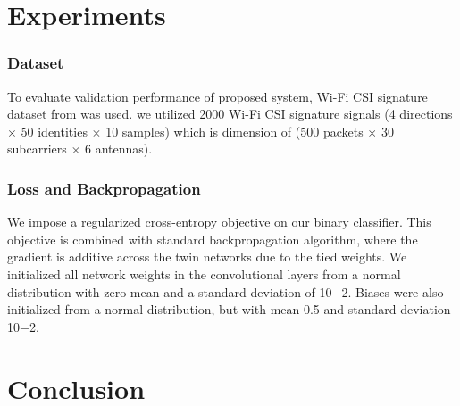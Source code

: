 \documentclass[runningheads]{llncs}
\begin{document}
\section{Experiments}
\subsubsection{Dataset}
 To evaluate validation performance of proposed system, Wi-Fi CSI signature dataset from \cite{moon2017air} was used.
 we utilized 2000 Wi-Fi CSI signature signals (4 directions $\times$ 50 identities $\times$ 10 samples) which is dimension of (500 packets $\times$ 30 subcarriers $\times$ 6 antennas). 
 


\subsubsection{Loss and Backpropagation}
 We impose a regularized cross-entropy objective on our binary classifier.
This objective is combined with standard backpropagation algorithm, where the gradient is additive across the twin networks due to the tied weights.
 We initialized all network weights in the convolutional layers from a normal distribution with zero-mean and a standard deviation of 10−2. Biases were also initialized from a normal distribution, but with mean 0.5 and standard deviation 10−2.

\section{Conclusion}

%
%
%
%
%
%






\end{document}
